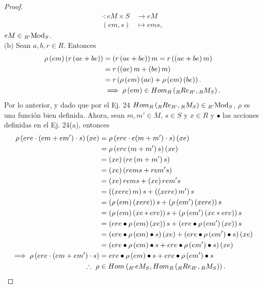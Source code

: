 \documentclass{article}
\newcommand{\lrprth}[1]{
	\left(#1\right)
}
\newcommand{\descapp}[6]{
	#1: #2 &\rightarrow #3\\
	#4 &\mapsto #5#6 
}
\newcommand{\ringbimod}[4]{
	\if#4l
	{}_{#1-#2}#3
	\else
	\if#4r
	#3_{#1-#2}
	\else 
	\ifstrequal{#4}{lr}{
		{}_{#1}#3_{#2}
	}
	\fi
	\fi
}
\newcommand{\ringmodhom}[3]{
	Hom_{#1}\lrprth{#2,#3}
}
\theoremstyle{definition}
\theoremstyle{plain}
\theoremstyle{plain}
\theoremstyle{definition}
\theoremstyle{definition}
\theoremstyle{definition}
\theoremstyle{definition}
\theoremstyle{definition}
\theoremstyle{definition}
\begin{document}
\begin{enumerate}[label=\textbf{Ej \arabic*.}]
\begin{proof}
\begin{align*}
		\descapp{\cdot}{eM\times S}{eM}{(em,s)}{e{ms}}{,}
	\end{align*}
	$eM\in\ringbimod{R'}{S}{\text{Mod}}{lr}$.\\
	$\boxed{\text{(b)}}$ Sean $a,b,r\in R$. Entonces
	\begin{align*}
		{\rho\lrprth{em}}\lrprth{r\lrprth{ae+be}}&=\lrprth{r\lrprth{ae+be}}m=r\lrprth{\lrprth{ae+be}m}\\
		&=r\lrprth{\lrprth{ae}m+\lrprth{be}m}\\
		&=r\lrprth{\rho\lrprth{em}(ae)+\rho\lrprth{em}(be)}.\\
		&\implies \rho\lrprth{em}\in\ringmodhom{R}{\ringbimod{R}{R'}{Re}{lr}}{\ringbimod{R}{S}{M}{lr}}.
	\end{align*}
	Por lo anterior, y dado que por el Ej. 24  $\ringmodhom{R}{\ringbimod{R}{R'}{Re}{lr}}{\ringbimod{R}{S}{M}{lr}}\in\ringbimod{R'}{S}{\text{Mod}}{lr}$, $\rho$ es una función bien definida. Ahora, sean $m,m'\in M$, $s\in S$ y $x\in R$ y $\bullet$ las acciones definidas en el Ej. 24(a), entonces 
	\begin{align*}
		\rho\lrprth{ere\cdot\lrprth{em+em'}\cdot s}\lrprth{xe}&=\rho\lrprth{{ere}\cdot{e{\lrprth{m+m'}}\cdot s}}(xe)\\
		&=\rho\lrprth{ere\lrprth{m+m'}s}(xe)\\
		&=\lrprth{xe}\lrprth{re\lrprth{m+m'}s}\\
		&=\lrprth{xe}\lrprth{rems+rem's}\\
		&=\lrprth{xe}{rems}+\lrprth{xe}{rem's}\\
		&=\lrprth{\lrprth{xere}m}s+\lrprth{\lrprth{xere}m'}s\\
		&=\lrprth{\rho\lrprth{em}\lrprth{xere}}s+\lrprth{\rho\lrprth{em'}\lrprth{xere}}s\\
		&=\lrprth{\rho\lrprth{em}\lrprth{xe*ere}}s+\lrprth{\rho\lrprth{em'}\lrprth{xe*ere}}s\\
		&=\lrprth{ere\bullet\rho\lrprth{em}\lrprth{xe}}s+\lrprth{ere\bullet\rho\lrprth{em'}\lrprth{xe}}s\\
		&=\lrprth{ere\bullet\rho\lrprth{em}\bullet s}\lrprth{xe}+\lrprth{ere\bullet\rho\lrprth{em'}\bullet s}\lrprth{xe}\\
		&=\lrprth{ere\bullet\rho\lrprth{em}\bullet s+ere\bullet\rho\lrprth{em'}\bullet s}\lrprth{xe}\\
		\implies \rho\lrprth{{ere}\cdot\lrprth{em+em'}\cdot s}&=ere\bullet\rho\lrprth{em}\bullet s+ere\bullet\rho\lrprth{em'}\bullet s\\
		\therefore\  \rho&\in\ringmodhom{}{\ringbimod{R'}{S}{eM}{lr}}{\ringmodhom{R}{\ringbimod{R}{R'}{Re}{lr}}{\ringbimod{R}{S}{M}{lr}}}.

\end{align*}
\end{proof}
\end{enumerate}
\end{document}
